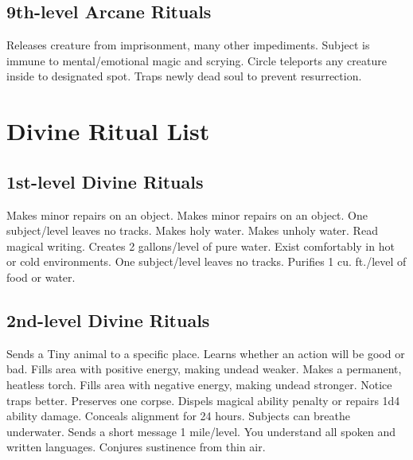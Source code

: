 \subsection{9th-level Arcane Rituals}
\begin{rituallist}
   Releases creature from imprisonment, many other impediments.
   Subject is immune to mental/emotional magic and scrying.
   Circle teleports any creature inside to designated spot.
  \F Traps newly dead soul to prevent resurrection.
\end{rituallist}

\section{Divine Ritual List}
\subsection{1st-level Divine Rituals}
\begin{rituallist}
   Makes minor repairs on an object.
   Makes minor repairs on an object.
   One subject/level leaves no tracks.
   Makes holy water.
   Makes unholy water.
   Read magical writing.
   Creates 2 gallons/level of pure water.
   Exist comfortably in hot or cold environments.
   One subject/level leaves no tracks.
   Purifies 1 cu. ft./level of food or water.
\end{rituallist}

\subsection{2nd-level Divine Rituals}
\begin{rituallist}
   Sends a Tiny animal to a specific place.
  \M\F Learns whether an action will be good or bad.
   Fills area with positive energy, making undead weaker.
   Makes a permanent, heatless torch.
   Fills area with negative energy, making undead stronger.
   Notice traps better.
   Preserves one corpse.
   Dispels magical ability penalty or repairs 1d4 ability damage.
   Conceals alignment for 24 hours.
   Subjects can breathe underwater.
   Sends a short message 1 mile/level.
   You understand all spoken and written languages.
   Conjures sustinence from thin air.
\end{rituallist}


